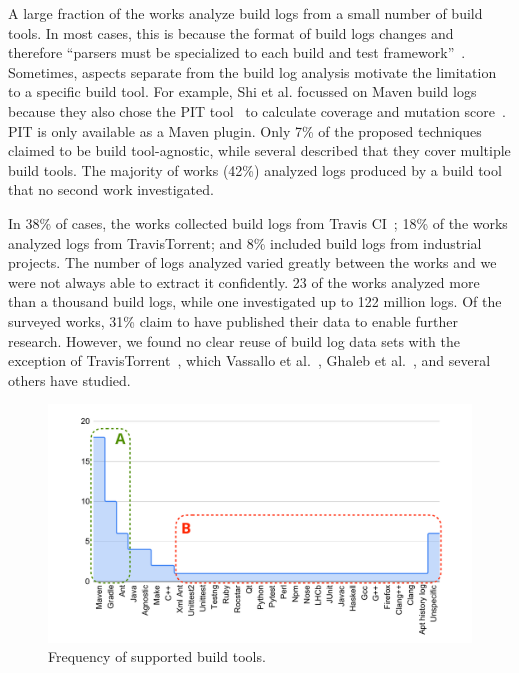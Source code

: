 A large fraction of the works analyze build logs
from a small number of build tools.
In most cases, this is because the format of build logs
changes and
therefore ``parsers must be specialized to each build and test
framework''~\cite{tomassi2019bugswarm}.
Sometimes, aspects separate from the build log analysis motivate
the limitation to a specific build tool.
For example, Shi et al.
focussed on Maven
build logs because they also chose the PIT tool~\cite{coles2016pit}
to calculate coverage
and mutation score~\cite{shi2018evaluating}.
PIT is only available as a Maven plugin.
Only 7\% of the proposed techniques claimed to be
build tool-agnostic, while
several described that they cover multiple build tools.
The majority of works (42\%) analyzed logs produced by a build tool
that no second work investigated.

In 38\% of cases, the works collected build logs from Travis
CI~\cite{travisci2019webpage};
18\% of the works analyzed logs from TravisTorrent; and 8\% included
build logs from industrial projects.
The number of logs analyzed varied greatly between the works
and we were not always able to
extract it confidently.
23 of the works analyzed more than a thousand build logs, while one
investigated up to 122 million logs.
Of the surveyed works, 31\% claim to have published their data to
enable further research.
However, we found no clear reuse of build log data sets with the
exception of TravisTorrent~\cite{beller2017travistorrent}, which
Vassallo et al.~\cite{vassallo2017a-tale},
Ghaleb et al.~\cite{ghaleb2019studying},
and several others have studied.

\begin{figure}[tbp]
		\centering
		\includegraphics[width=\columnwidth, trim={1.5cm 0.4cm
		1.5cm 0.5cm},
		clip]{img/lit-sur/log_producer_annotated.pdf}
		\caption{Frequency of supported build tools.}
		\label{fig:litsur:log_producer}
\end{figure}


